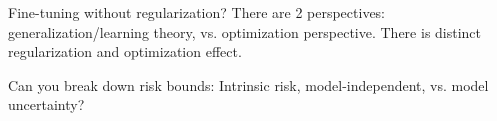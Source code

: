 Fine-tuning without regularization? There are 2 perspectives: generalization/learning theory, vs. optimization perspective. There is distinct regularization and optimization effect.

Can you break down risk bounds: Intrinsic risk, model-independent, vs. model uncertainty?

